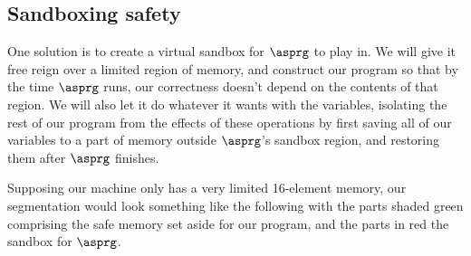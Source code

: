 \documentclass[11pt,twoside]{scrartcl}
\begin{document}
\subsection{Sandboxing safety}
One solution is to create a virtual sandbox for $\asprg$ to play in. We will give it free reign over a limited region of memory, and construct our program so that by the time $\asprg$ runs, our correctness doesn't depend on the contents of that region. We will also let it do whatever it wants with the variables, isolating the rest of our program from the effects of these operations by first saving all of our variables to a part of memory outside $\asprg$'s sandbox region, and restoring them after $\asprg$ finishes.

Supposing our machine only has a very limited 16-element memory, our segmentation would look something like the following with the parts shaded green comprising the safe memory set aside for our program, and the parts in red the sandbox for $\asprg$.
\end{document}
